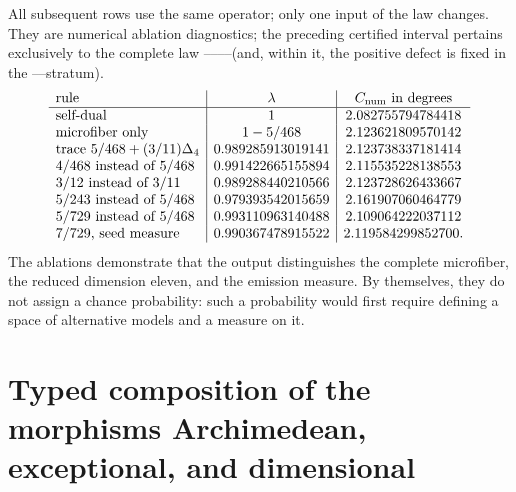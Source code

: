 All subsequent rows use the same operator; only one input
of the law changes. They are numerical ablation diagnostics; the preceding certified
interval pertains exclusively to the complete law
\HTr--\HAdd--\HDef--\HRes--\HLoc (and, within it, the positive defect is fixed in the
\HTr--\HAdd--\HDef stratum).
\[
\begin{array}{l|c|c}
\text{rule}&\lambda&C_{\rm num}\text{ in degrees}\\ \hline
\text{self-dual}&1&2.082755794784418\\
\text{microfiber only}&1-5/468&2.123621809570142\\
\text{trace }5/468+(3/11)\Delta_4
&0.989285913019141&2.123738337181414\\
4/468\text{ instead of }5/468
&0.991422665155894&2.115535228138553\\
3/12\text{ instead of }3/11
&0.989288440210566&2.123728626433667\\
5/243\text{ instead of }5/468
&0.979393542015659&2.161907060464779\\
5/729\text{ instead of }5/468
&0.993110963140488&2.109064222037112\\
7/729\text{, seed measure}
&0.990367478915522&2.119584299852700.
\end{array}
\]
The ablations demonstrate that the output distinguishes the complete microfiber,
the reduced dimension eleven, and the emission measure. By themselves, they do
not assign a chance probability: such a probability would first require defining a
space of alternative models and a measure on it.

\section{Typed composition of the morphisms Archimedean, exceptional, and dimensional}

